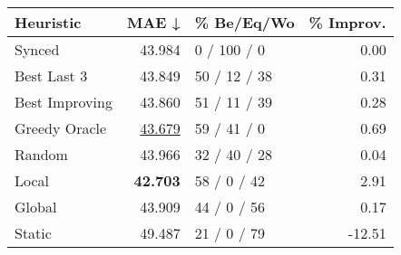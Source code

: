 \begin{tabular}{lrlr}
\toprule
\textbf{Heuristic} & \textbf{MAE ↓} & \textbf{\% Be/Eq/Wo} & \textbf{\% Improv.} \\
\midrule
            Synced &         43.984 &          0 / 100 / 0 &                0.00 \\
\midrule
       Best Last 3 &         43.849 &         50 / 12 / 38 &                0.31 \\
    Best Improving &         43.860 &         51 / 11 / 39 &                0.28 \\
\addlinespace
     Greedy Oracle &         \underline{43.679} &          59 / 41 / 0 &                0.69 \\
            Random &         43.966 &         32 / 40 / 28 &                0.04 \\
\midrule
             Local &         \textbf{42.703} &          58 / 0 / 42 &                2.91 \\
            Global &         43.909 &          44 / 0 / 56 &                0.17 \\
\midrule
            Static &         49.487 &          21 / 0 / 79 &              -12.51 \\
\bottomrule
\end{tabular}

\label{tab:iid_lr01_le2_bs4_Summary}

